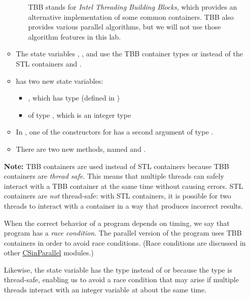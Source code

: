 \documentclass[letterpaper,10pt,openany,oneside]{sphinxmanual}
\begin{document}
\begin{enumerate}
\begin{itemize}
\begin{itemize}
TBB stands for \emph{Intel Threading Building Blocks}, which
provides an alternative implementation of some common
containers. TBB also provides various parallel algorithms, but
we will not use those algorithm features in this lab.

\end{itemize}

\item {} 
The state variables , , and 
use the TBB container types  or
 instead of the STL containers
 and .

\item {} 
 has two new state variables:
\begin{itemize}
\item {} 
, which has type  (defined in
)

\item {} 
 of type , which is an integer type

\end{itemize}

\item {} 
In , one of the constructors for  has a
second argument of type .

\item {} 
There are two new methods, named  and .

\end{itemize}

\textbf{Note:} TBB containers are used instead of STL containers because
TBB containers are \emph{thread safe}. This means that multiple threads
can safely interact with a TBB container at the same time without
causing errors. STL containers are \emph{not} thread-safe: with STL
containers, it is possible for two threads to interact with a
container in a way that produces incorrect results.

When the correct behavior of a program depends on timing, we say that
program has a \emph{race condition}. The parallel version of the program
uses TBB containers in order to avoid race conditions. (Race
conditions are discussed in other
\href{http://csinparallel.org/}{CSinParallel} modules.)

Likewise, the state variable  has the type
 instead of  or  because the
 type is thread-safe, enabling us to avoid a race
condition that may arise if multiple threads interact with an integer
variable at about the same time.


\end{enumerate}
\end{document}
